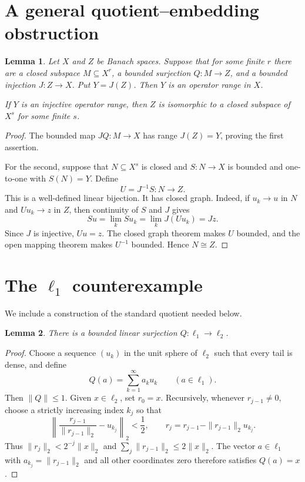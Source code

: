 \documentclass[11pt]{article}
\newtheorem{lemma}{Lemma}
\begin{document}
\section{A general quotient--embedding obstruction}

\begin{lemma}\label{lem:criterion}
Let $X$ and $Z$ be Banach spaces.  Suppose that for some finite $r$ there are
a closed subspace $M\subseteq X^r$, a bounded surjection $Q:M\to Z$, and a
bounded injection $J:Z\to X$.  Put $Y=J(Z)$.  Then $Y$ is an operator range
in $X$.

If $Y$ is an injective operator range, then $Z$ is isomorphic to a closed
subspace of $X^s$ for some finite $s$.
\end{lemma}

\begin{proof}
The bounded map $JQ:M\to X$ has range $J(Z)=Y$, proving the first assertion.

For the second, suppose that $N\subseteq X^s$ is closed and
$S:N\to X$ is bounded and one-to-one with $S(N)=Y$.  Define
\[
                       U=J^{-1}S:N\longrightarrow Z.
\]
This is a well-defined linear bijection.  It has closed graph.  Indeed, if
$u_k\to u$ in $N$ and $Uu_k\to z$ in $Z$, then continuity of $S$ and $J$
gives
\[
        Su=\lim_k Su_k=\lim_k J(Uu_k)=Jz.
\]
Since $J$ is injective, $Uu=z$.  The closed graph theorem makes $U$ bounded,
and the open mapping theorem makes $U^{-1}$ bounded.  Hence $N\cong Z$.
\end{proof}

\section{The $\ell_1$ counterexample}

We include a construction of the standard quotient needed below.

\begin{lemma}\label{lem:quotient}
There is a bounded linear surjection $Q:\ell_1\to\ell_2$.
\end{lemma}

\begin{proof}
Choose a sequence $(u_k)$ in the unit sphere of $\ell_2$ such that every tail
is dense, and define
\[
            Q(a)=\sum_{k=1}^{\infty}a_k u_k
            \qquad(a\in\ell_1).
\]
Then $\|Q\|\leq1$.  Given $x\in\ell_2$, set $r_0=x$.  Recursively, whenever
$r_{j-1}\ne0$, choose a strictly increasing index $k_j$ so that
\[
 \left\|\frac{r_{j-1}}{\|r_{j-1}\|_2}-u_{k_j}\right\|_2<\frac12,
 \qquad
 r_j=r_{j-1}-\|r_{j-1}\|_2u_{k_j}.
\]
Thus $\|r_j\|_2<2^{-j}\|x\|_2$ and
$\sum_j\|r_{j-1}\|_2\leq2\|x\|_2$.  The vector $a\in\ell_1$ with
$a_{k_j}=\|r_{j-1}\|_2$ and all other coordinates zero therefore satisfies
$Q(a)=x$.
\end{proof}
\end{document}
